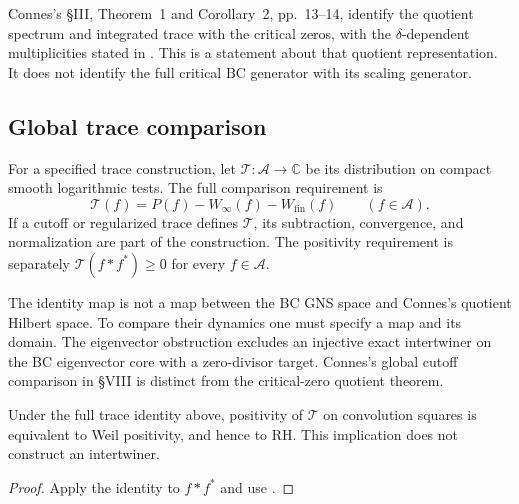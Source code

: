 \begin{proposition}
\label{v4-arith:w9-r4:thm:connes-trace-eq}
Connes's \S III, Theorem~1 and Corollary~2, pp.~13--14,
identify the quotient spectrum and integrated trace with the
critical zeros, with the \(\delta\)-dependent multiplicities
stated in .
This is a statement about that quotient representation.
It does not identify the full critical BC generator with its
scaling generator.
\end{proposition}

\subsection{Global trace comparison}
\label{v4-arith:w9-r4:connes-1999:limitation}
\begin{definition}
\label{v4-arith:w9-r4:thm:connes-absorption}
For a specified trace construction, let
\(\mathcal T:\mathscr A\to\mathbb C\) be its distribution on
compact smooth logarithmic tests. The full comparison requirement is
\[
 \mathcal T(f)=P(f)-W_\infty(f)-W_{\mathrm{fin}}(f)
 \qquad(f\in\mathscr A).
\]
If a cutoff or regularized trace defines \(\mathcal T\), its
subtraction, convergence, and normalization are part of the
construction. The positivity requirement is separately
\(\mathcal T(f*f^*)\geq0\) for every \(f\in\mathscr A\).
\end{definition}

\begin{remark}
\label{v4-arith:w9-r4:rem:connes-not-uncond}
The identity map is not a map between the BC GNS space and
Connes's quotient Hilbert space. To compare their dynamics one
must specify a map and its domain. The eigenvector obstruction
excludes an injective exact intertwiner on the BC eigenvector
core with a zero-divisor target. Connes's global cutoff comparison
in \S VIII is distinct from the critical-zero quotient theorem.
\end{remark}

\begin{proposition}
\label{v4-arith:w9-r4:prop:connes-eq-HPAr}
Under the full trace identity above, positivity of \(\mathcal T\)
on convolution squares is equivalent to Weil positivity, and
hence to RH. This implication does not construct an intertwiner.
\end{proposition}
\begin{proof}
Apply the identity to \(f*f^*\) and use
.
\end{proof}

